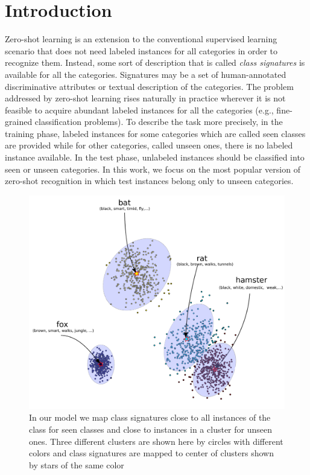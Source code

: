 \documentclass[letterpaper]{article}
\begin{document}
\section{Introduction}
Zero-shot learning \cite{bengio08,hinton09,lampert09,farhadi09} is an extension to the conventional supervised learning scenario
that does not need labeled instances for all categories in order to recognize them.
Instead, some sort of description that is called \textit{class signatures} is available for all the categories.
Signatures may be a set of human-annotated discriminative attributes or textual description of the categories.
The problem addressed by zero-shot learning rises naturally in practice wherever it is not feasible to acquire abundant labeled instances for
 all the categories (e.g., fine-grained classification problems).
To describe the task more precisely, in the training phase, labeled instances for some categories which are called seen classes are provided
while for other categories, called unseen ones, there is no labeled instance available.
In the test phase, unlabeled instances should be classified into seen or unseen categories.
 In this work, we focus on the most popular version of zero-shot recognition in which test instances belong only to unseen categories.
 \begin{figure}[!t]
 \begin{center}
 \includegraphics[width=0.98\columnwidth]{overview.pdf}
 \caption{In our model we map class signatures close to all instances of the class for seen classes and close to instances in a cluster for unseen ones.
 Three different clusters are shown here by circles with different colors and class signatures are mapped to center of clusters shown by stars of the same color}
 \label{fig:overview}
 \end{center}
 \vspace{-8mm}
 \end{figure}
\end{document}

